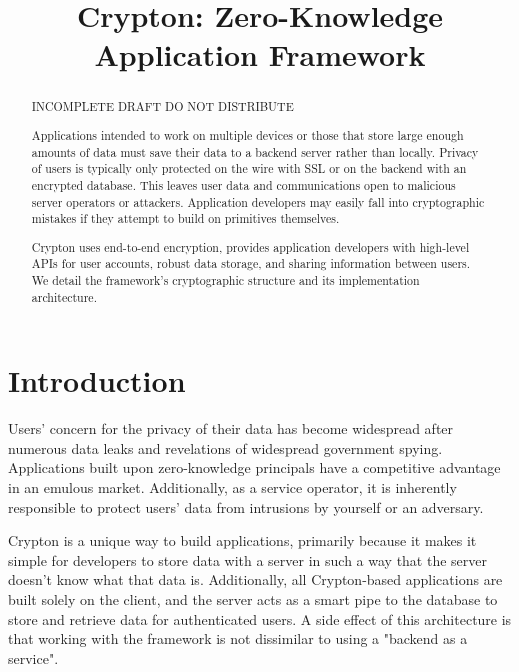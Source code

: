 \documentclass[conference]{IEEEtran}
\begin{document}
\title{Crypton: Zero-Knowledge Application Framework}

\author{
  \and
}

\maketitle

\begin{abstract}
INCOMPLETE DRAFT DO NOT DISTRIBUTE

Applications intended to work on multiple devices or those that
store large enough amounts of data must save their data to a backend server
rather than locally. Privacy of users is typically only protected on the wire
with SSL or on the backend with an encrypted database. This leaves user data
and communications open to malicious server operators or attackers.
Application developers may easily fall into cryptographic
mistakes if they attempt to build on primitives themselves.

Crypton uses end-to-end encryption, provides application developers
with high-level APIs for user accounts, robust data storage, and
sharing information between users. We detail the framework's cryptographic
structure and its implementation architecture.
\end{abstract}

\section{Introduction}
Users' concern for the privacy of their data has become widespread
after numerous data leaks and revelations of widespread government spying\cite{spying}.
Applications built upon zero-knowledge principals have a competitive
advantage in an emulous market. Additionally, as a service operator,
it is inherently responsible to protect users' data from intrusions
by yourself or an adversary.

Crypton is a unique way to build applications, primarily because it
makes it simple for developers to store data with a server in such a way
that the server doesn't know what that data is.
Additionally, all Crypton-based applications are built solely on the client,
and the server acts as a smart pipe to the database to store and retrieve data
for authenticated users. A side effect of this architecture is that working with the framework is not dissimilar to using a "backend as a service".
\end{document}
